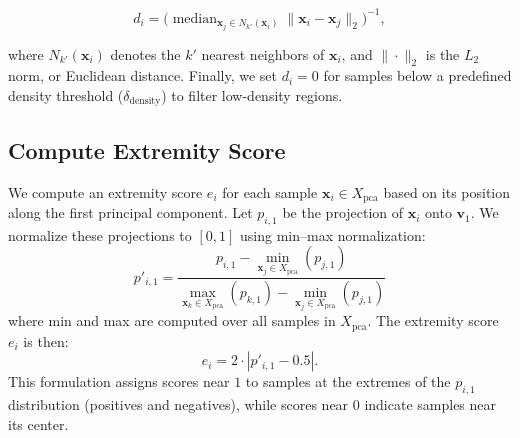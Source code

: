 \documentclass[preprint,12pt]{elsarticle}
\begin{document}
\begin{equation}
\label{eq:density_score}
d_i = \bigl(\operatorname{median}_{\mathbf{x}_j \in N_{k'}(\mathbf{x}_i)} \|\mathbf{x}_i - \mathbf{x}_j\|_2 \bigr)^{-1},
\end{equation}

where $N_{k'}(\mathbf{x}_i)$ denotes the $k'$ nearest neighbors of $\mathbf{x}_i$, and $\|\cdot\|_2$ is the $L_2$ norm, or Euclidean distance. Finally, we set $d_i = 0$ for samples below a predefined density threshold ($\delta_{\text{density}}$) to filter low-density regions.

\subsection{Compute Extremity Score} \label{subsec:extremity_composite_score}

We compute an extremity score $e_i$ for each sample $\mathbf{x}_i \in X_{\text{pca}}$ based on its position along the first principal component. Let $p_{i,1}$ be the projection of $\mathbf{x}_i$ onto $\mathbf{v}_1$. We normalize these projections to $[0,1]$ using min–max normalization:
\begin{equation} \label{eq:pc1_normalized}
    p'_{i,1} = \frac{p_{i,1} - \min_{\mathbf{x}_j \in X_{\text{pca}}}(p_{j,1})}{\max_{\mathbf{x}_k \in X_{\text{pca}}}(p_{k,1}) - \min_{\mathbf{x}_j \in X_{\text{pca}}}(p_{j,1})}
\end{equation}
where min and max are computed over all samples in $X_{\text{pca}}$. The extremity score $e_i$ is then:
\begin{equation} \label{eq:extremity_score}
    e_i = 2 \cdot \left| p'_{i,1} - 0.5 \right|.
\end{equation}
This formulation assigns scores near $1$ to samples at the extremes of the $p_{i,1}$ distribution (positives and negatives), while scores near 0 indicate samples near its center.
\end{document}
